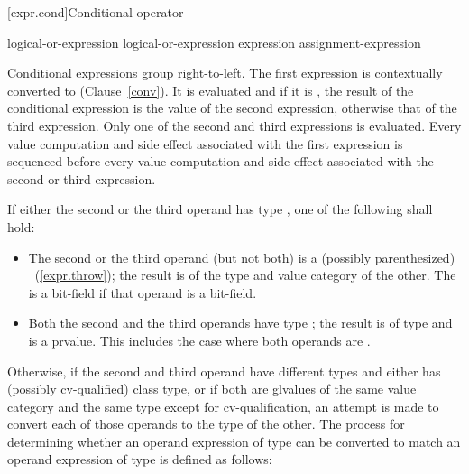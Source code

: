 [expr.cond]{Conditional operator}%
%
%
%

\begin{bnf}
\br
    logical-or-expression\br
    logical-or-expression  expression \terminal{:} assignment-expression
\end{bnf}

\pnum
Conditional expressions group right-to-left. The first expression is
contextually converted to 
(Clause~\ref{conv}). It is
evaluated and if it is , the result of the conditional
expression is the value of the second expression, otherwise that of the
third expression. Only one of the second and third expressions is
evaluated. Every
%
value computation and side effect associated with the
first expression is sequenced before every value computation and side
effect associated with the second or third expression.

\pnum
If either the second or the third operand has type ,
one of the following shall hold:

\begin{itemize}
%
\item The second or the third operand (but not both) is a (possibly
parenthesized) ~(\ref{expr.throw}); the result
is of the type and value category of the other.
The 
is a bit-field if that operand is a bit-field.

\item Both the second and the third operands have type ; the
result is of type  and is a prvalue. \enternote This
includes the case where both operands are .
\exitnote
\end{itemize}

\pnum
Otherwise, if the second and third operand have different types and
either has (possibly cv-qualified) class type, or if both
are glvalues of the same value category and the same type except for
cv-qualification, an attempt is made to
convert each of those operands to the type of the other. The process for
determining whether an operand expression  of type 
can be converted to match an operand expression  of type
 is defined as follows:

